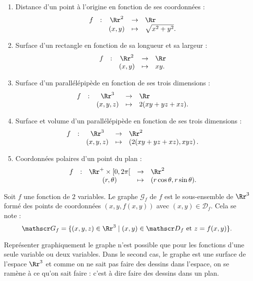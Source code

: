 \documentclass[class=report,crop=false]{standalone}
\begin{document}
\begin{enumerate}
\item Distance d'un point à l'origine en fonction de ses coordonnées :
$$\begin{array}{ccccl}f&:&\Rr^2&\to &\Rr\\ &&(x,y)&\mapsto &\sqrt{x^2+y^2}.\end{array}$$
\item Surface d'un rectangle en fonction de sa longueur et sa largeur :
$$\begin{array}{ccccl}f&:&\Rr^2&\to &\Rr\\ &&(x,y)&\mapsto &xy.\end{array}$$
\item Surface d'un parallélépipède en fonction de ses trois dimensions :
$$\begin{array}{ccccl}f&:&\Rr^3&\to &\Rr\\ &&(x,y,z)&\mapsto &2(xy+yz+xz).\end{array}$$
\item Surface et volume d'un parallélépipède en fonction de ses trois dimensions :
$$\begin{array}{ccccl}f&:&\Rr^3&\to &\Rr^2\\ &&(x,y,z)&\mapsto &\left(2(xy+yz+xz),xyz\right).\end{array}$$
\item Coordonnées polaires d'un point du plan :
$$\begin{array}{ccccl}f&:&\Rr^+\times [0,2\pi[&\to &\Rr^2\\ &&(r,\theta)&\mapsto &(r\cos \theta ,r\sin \theta ).\end{array}$$
\end{enumerate}

\vskip6mm

\begin{definition} Soit $f$ une fonction de $2$ variables. Le graphe ${\mathscr G}_f$ de $f$ est le sous-ensemble de $\Rr^3$ formé des points de coordonnées $(x,y,f(x,y))$ avec $(x,y)\in {\mathscr D}_f$. Cela se note :
$${\mathscr G}_f=\{(x,y,z)\in \Rr^3\mid (x,y)\in {\mathscr D}_f\mbox{ et }z=f(x,y)\}.$$
\end{definition}

\vskip4mm

Représenter graphiquement le graphe n'est possible que pour les fonctions d'une seule variable ou deux variables. Dans le second cas, le graphe est une surface de l'espace $\Rr^3$ et comme on ne sait pas faire des dessins dans l'espace, on se ramène à ce qu'on sait faire : c'est à dire faire des dessins dans un plan.
\end{document}
